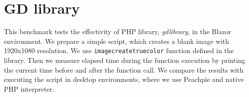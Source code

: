 \section{GD library}

This benchmark tests the effectivity of PHP library, \textit{gdlibrary}, in the Blazor environment.
We prepare a simple script, which creates a blank image with 1920x1080 resolution.
We use \texttt{imagecreatetruecolor} function defined in the library.
Then we measure elapsed time during the function execution by printing the current time before and after the function call.
We compare the results with executing the script in desktop environments, where we use Peachpie and native PHP interpreter.

